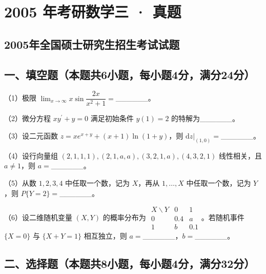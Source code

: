 \documentclass[UTF8,12pt]{ctexart}
\begin{document}
\section*{2005 年考研数学三 · 真题}
\subsection*{2005年全国硕士研究生招生考试试题}

\subsection*{一、填空题（本题共6小题，每小题4分，满分24分）}

（1）极限 \(\displaystyle \lim_{x\to\infty}x\sin\dfrac{\displaystyle 2x}{\displaystyle x^2+1}=\)\_\_\_\_\_\_。


（2）微分方程 \(\displaystyle xy^{\prime}+y=0\) 满足初始条件 \(\displaystyle y(1)=2\) 的特解为\_\_\_\_\_\_。


（3）设二元函数 \(\displaystyle z=xe^{x+y}+(x+1)\ln(1+y)\)，则 \(\displaystyle \left.\mathrm dz\right|_{(1,\allowbreak 0)}=\)\_\_\_\_\_\_。


（4）设行向量组 \(\displaystyle (2,\allowbreak 1,\allowbreak 1,\allowbreak 1),\allowbreak (2,\allowbreak 1,\allowbreak a,\allowbreak a),\allowbreak (3,\allowbreak 2,\allowbreak 1,\allowbreak a),\allowbreak (4,\allowbreak 3,\allowbreak 2,\allowbreak 1)\) 线性相关，且 \(\displaystyle a\ne1\)，则 \(\displaystyle a=\)\_\_\_\_\_\_。


（5）从数 \(\displaystyle 1,\allowbreak 2,\allowbreak 3,\allowbreak 4\) 中任取一个数，记为 \(\displaystyle X\)，再从 \(\displaystyle 1,\allowbreak \ldots,\allowbreak X\) 中任取一个数，记为 \(\displaystyle Y\)，则 \(\displaystyle P\{Y=2\}=\)\_\_\_\_\_\_。


（6）设二维随机变量 \(\displaystyle (X,\allowbreak Y)\) 的概率分布为 \(\displaystyle \begin{array}{c|cc}X\backslash Y&0&1\\\hline0&0.4&a\\1&b&0.1\end{array}\)。若随机事件 \(\displaystyle \{X=0\}\) 与 \(\displaystyle \{X+Y=1\}\) 相互独立，则 \(\displaystyle a=\)\_\_\_\_\_\_，\(\displaystyle b=\)\_\_\_\_\_\_。


\subsection*{二、选择题（本题共8小题，每小题4分，满分32分）}
\end{document}
